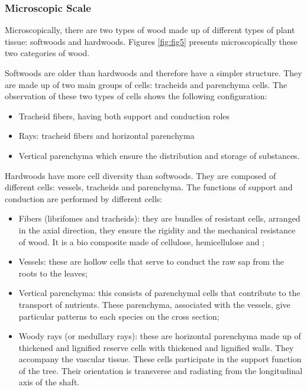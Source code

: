 \subsubsection{Microscopic Scale}

Microscopically, there are two types of wood made up of different types of plant tissue: softwoods and hardwoods. Figures \ref{fig:fig5} presents microscopically these two categories of wood.

Softwoods are older than hardwoods and therefore have a simpler structure. They are made up of two main groups of cells: tracheids and parenchyma cells. The observation of these two types of cells shows the following configuration:

\begin{itemize}
	\item Tracheid fibers, having both support and conduction roles
	\item Rays: tracheid fibers and horizontal parenchyma
	\item Vertical parenchyma which ensure the distribution and storage of substances.
\end{itemize}

Hardwoods have more cell diversity than softwoods. They are composed of different cells: vessels, tracheids and parenchyma. The functions of support and conduction are performed by different cells:

\begin{itemize}
	\item Fibers (librifomes and tracheids): they are bundles of resistant cells, arranged in the axial direction, they ensure the rigidity and the mechanical resistance of wood. It is a bio composite made of cellulose, hemicellulose and ;
	\item Vessels: these are hollow cells that serve to conduct the raw sap from the roots to the leaves;
	\item Vertical parenchyma: this consists of parenchymal cells that contribute to the transport of nutrients. These parenchyma, associated with the vessels, give particular patterns to each species on the cross section;
	\item Woody rays (or medullary rays): these are horizontal parenchyma made up of thickened and lignified reserve cells with thickened and lignified walls. They accompany the vascular tissue. These cells participate in the support function of the tree. Their orientation is transverse and radiating from the longitudinal axis of the shaft.
\end{itemize}



